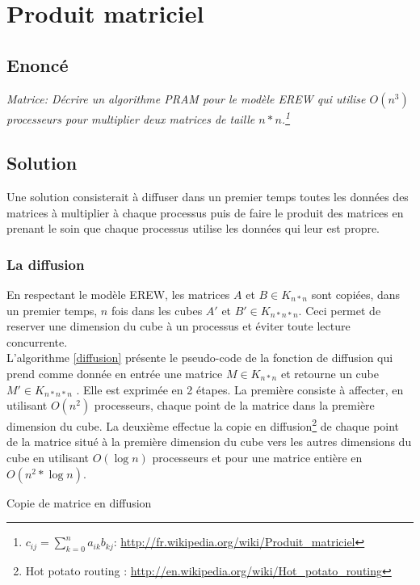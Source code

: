 \section{Produit matriciel}

\subsection{Enoncé}
\textit{Matrice: Décrire un algorithme PRAM pour le modèle EREW qui utilise $O(n^3)$ processeurs pour multiplier deux matrices de taille $n*n$.\footnote{$c_{ij} = \sum_{k=0}^n a_{ik} b_{kj}$: \url{http://fr.wikipedia.org/wiki/Produit_matriciel}}}

\subsection{Solution}
Une solution consisterait à diffuser dans un premier temps toutes les données des matrices à multiplier à chaque processus puis de faire le produit des matrices en prenant le soin que chaque processus utilise les données qui leur est propre.

\subsubsection{La diffusion}
En respectant le modèle EREW, les matrices $A$ et $B \in K_{n*n}$ sont copiées, dans un premier temps, $n$ fois dans les cubes $A'$ et $B' \in K_{n*n*n}$. Ceci permet de reserver une dimension du cube à un processus et éviter toute lecture concurrente.\\

L'algorithme \ref{diffusion} présente le pseudo-code de la fonction de diffusion qui prend comme donnée en entrée une matrice $M \in K_{n*n}$ et retourne un cube $M' \in K_{n*n*n}$ . Elle est exprimée en 2 étapes. La première consiste à affecter, en utilisant $O(n^2)$ processeurs, chaque point de la matrice dans la première dimension du cube. La deuxième effectue la copie en diffusion\footnote{Hot potato routing : \url{http://en.wikipedia.org/wiki/Hot_potato_routing}} de chaque point de la matrice situé à la première dimension du cube vers les autres dimensions du cube en utilisant $O(\log{n})$ processeurs et pour une matrice entière en $O(n^2 * \log{n})$.

\incmargin{1em}
\begin{algorithm}
  \label{diffusion}
  \caption{Copie de matrice en diffusion}
\end{algorithm}

